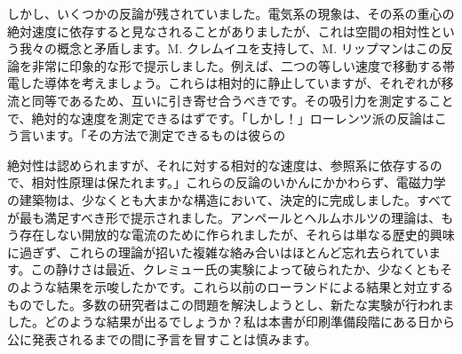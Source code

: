 \documentclass[a4paper,11pt,openany]{ltjsbook}
\begin{document}
しかし、いくつかの反論が残されていました。電気系の現象は、その系の重心の絶対速度に依存すると見なされることがありましたが、これは空間の相対性という我々の概念と矛盾します。M. クレムイユを支持して、M. リップマンはこの反論を非常に印象的な形で提示しました。例えば、二つの等しい速度で移動する帯電した導体を考えましょう。これらは相対的に静止していますが、それぞれが移流と同等であるため、互いに引き寄せ合うべきです。その吸引力を測定することで、絶対的な速度を測定できるはずです。「しかし！」ローレンツ派の反論はこう言います。「その方法で測定できるものは彼らの


絶対性は認められますが、それに対する相対的な速度は、参照系に依存するので、相対性原理は保たれます。」これらの反論のいかんにかかわらず、電磁力学の建築物は、少なくとも大まかな構造において、決定的に完成しました。すべてが最も満足すべき形で提示されました。アンペールとヘルムホルツの理論は、もう存在しない開放的な電流のために作られましたが、それらは単なる歴史的興味に過ぎず、これらの理論が招いた複雑な絡み合いはほとんど忘れ去られています。この静けさは最近、クレミュー氏の実験によって破られたか、少なくともそのような結果を示唆したかです。これら以前のローランドによる結果と対立するものでした。多数の研究者はこの問題を解決しようとし、新たな実験が行われました。どのような結果が出るでしょうか？私は本書が印刷準備段階にある日から公に発表されるまでの間に予言を冒すことは慎みます。
\end{document}
